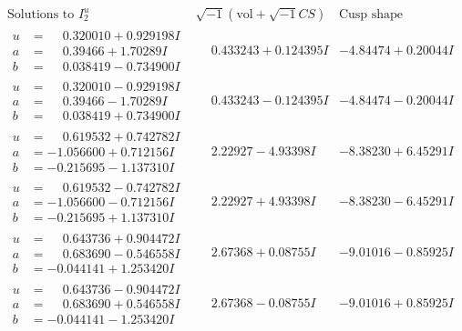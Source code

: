 \documentclass[1p]{elsarticle_modified}
\theoremstyle{definition}
\newcommand{\I}{\sqrt{-1}}
\begin{document}
$$\begin{array}{c|c|c}  
\text{Solutions to }I^u_{2}& \I (\text{vol} + \sqrt{-1}CS) & \text{Cusp shape}\\
 \hline 
\begin{aligned}
u &= \phantom{-}0.320010 + 0.929198 I \\
a &= \phantom{-}0.39466 + 1.70289 I \\
b &= \phantom{-}0.038419 - 0.734900 I\end{aligned}
 & \phantom{-}0.433243 + 0.124395 I & -4.84474 + 0.20044 I \\ \hline\begin{aligned}
u &= \phantom{-}0.320010 - 0.929198 I \\
a &= \phantom{-}0.39466 - 1.70289 I \\
b &= \phantom{-}0.038419 + 0.734900 I\end{aligned}
 & \phantom{-}0.433243 - 0.124395 I & -4.84474 - 0.20044 I \\ \hline\begin{aligned}
u &= \phantom{-}0.619532 + 0.742782 I \\
a &= -1.056600 + 0.712156 I \\
b &= -0.215695 - 1.137310 I\end{aligned}
 & \phantom{-}2.22927 - 4.93398 I & -8.38230 + 6.45291 I \\ \hline\begin{aligned}
u &= \phantom{-}0.619532 - 0.742782 I \\
a &= -1.056600 - 0.712156 I \\
b &= -0.215695 + 1.137310 I\end{aligned}
 & \phantom{-}2.22927 + 4.93398 I & -8.38230 - 6.45291 I \\ \hline\begin{aligned}
u &= \phantom{-}0.643736 + 0.904472 I \\
a &= \phantom{-}0.683690 - 0.546558 I \\
b &= -0.044141 + 1.253420 I\end{aligned}
 & \phantom{-}2.67368 + 0.08755 I & -9.01016 - 0.85925 I \\ \hline\begin{aligned}
u &= \phantom{-}0.643736 - 0.904472 I \\
a &= \phantom{-}0.683690 + 0.546558 I \\
b &= -0.044141 - 1.253420 I\end{aligned}
 & \phantom{-}2.67368 - 0.08755 I & -9.01016 + 0.85925 I \\ \hline\begin{aligned}

\end{aligned}
\end{array}$$
\end{document}
